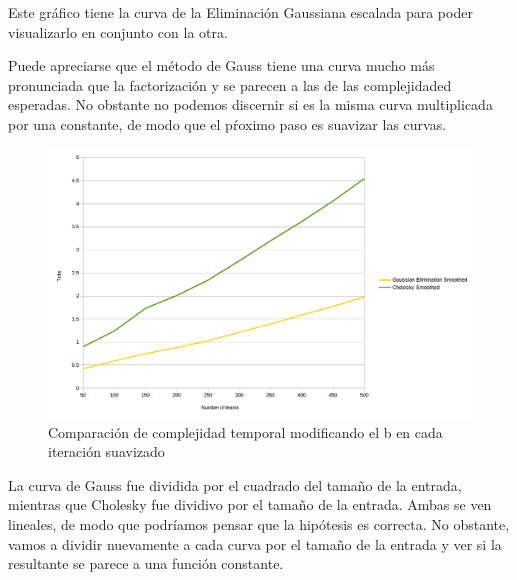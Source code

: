 Este gr\'afico tiene la curva de la Eliminaci\'on Gaussiana escalada para poder visualizarlo en conjunto con la otra.

Puede apreciarse que el m\'etodo de Gauss tiene una curva mucho m\'as pronunciada que la factorizaci\'on y se parecen a las de las complejidaded esperadas. No obstante no podemos discernir si es la misma curva multiplicada por una constante, de modo que el p\'roximo paso es suavizar las curvas.

\begin{figure}[h!]
  \begin{center}
	\includegraphics[scale=0.50]{imagenes/cuantitative/bChange/ColleyMatrixCuantitativeBChangeAnalysisSmoothed.png}
	\caption{Comparaci\'on de complejidad temporal modificando el b en cada iteraci\'on suavizado}
	\label{bChangeSmoothed}
  \end{center}
\end{figure}

La curva de Gauss fue dividida por el cuadrado del tama\~no de la entrada, mientras que Cholesky fue dividivo por el tama\~no de la entrada. Ambas se ven lineales, de modo que podr\'iamos pensar que la hip\'otesis es correcta. No obstante, vamos a dividir nuevamente a cada curva por el tama\~no de la entrada y ver si la resultante se parece a una funci\'on constante.

\newpage


